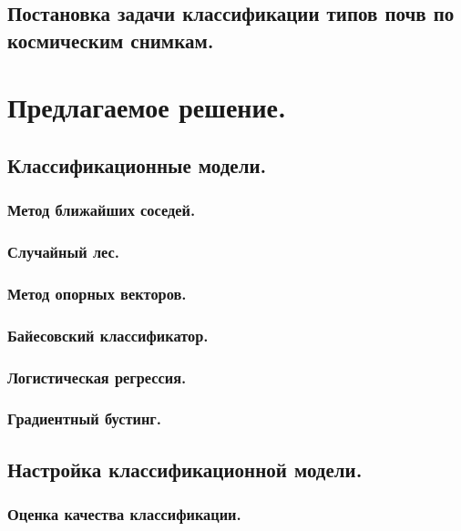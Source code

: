 \documentclass[12pt]{article}
\begin{document}
\subsection{Постановка задачи классификации типов почв по космическим снимкам.}


\section{Предлагаемое решение.}


\subsection{Классификационные модели.}


\subsubsection{Метод ближайших соседей.}


\subsubsection{Случайный лес.}


\subsubsection{Метод опорных векторов.}


\subsubsection{Байесовский классификатор.}


\subsubsection{Логистическая регрессия.}


\subsubsection{Градиентный бустинг.}


\subsection{Настройка классификационной модели.}


\subsubsection{Оценка качества классификации.}
\end{document}
